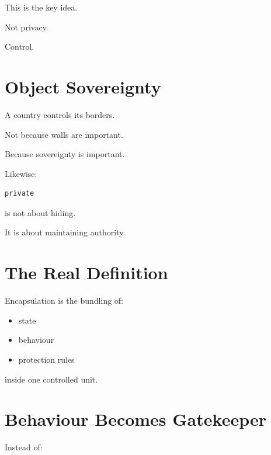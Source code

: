 \documentclass[11pt,a4paper]{book}
\begin{document}
This is the key idea.

Not privacy.

Control.


\section{Object Sovereignty}

\begin{mentalmodel}

A country controls its borders.

Not because walls are important.

Because sovereignty is important.

\end{mentalmodel}

Likewise:

\begin{verbatim}
private
\end{verbatim}

is not about hiding.

It is about maintaining authority.


\section{The Real Definition}

\begin{idea}

Encapsulation is the bundling of:

\begin{itemize}
\item state
\item behaviour
\item protection rules
\end{itemize}

inside one controlled unit.

\end{idea}


\section{Behaviour Becomes Gatekeeper}

Instead of:
\end{document}
